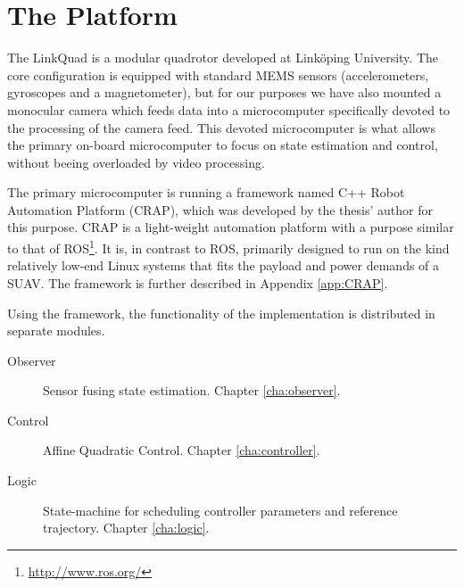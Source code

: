 \section{The Platform}
    The LinkQuad is a modular quadrotor developed at Linköping University.
    The core configuration is equipped with standard MEMS sensors
    (accelerometers, gyroscopes and a magnetometer),
    but for our purposes we have also mounted a monocular camera which feeds data
    into a microcomputer specifically devoted to the processing of the camera feed.
    This devoted microcomputer is what allows the primary on-board microcomputer
    to focus on state estimation and control, without beeing overloaded by
    video processing.

    The primary microcomputer is running a framework named C++ Robot Automation Platform (CRAP),
    which was developed by the thesis' author for this purpose. CRAP is a light-weight
    automation platform with a purpose similar to that of ROS\footnote{\url{http://www.ros.org/}}.
    It is, in contrast to ROS, primarily designed to run on the kind relatively low-end Linux systems
    that fits the payload and power demands of a SUAV. The framework is further
    described in Appendix \ref{app:CRAP}.

    Using the framework, the functionality of the implementation is
    distributed in separate modules.
    \begin{description}
        \item[Observer] Sensor fusing state estimation. Chapter \ref{cha:observer}.
        \item[Control]  Affine Quadratic Control. Chapter \ref{cha:controller}.
        \item[Logic]    State-machine for scheduling controller parameters and reference trajectory. Chapter \ref{cha:logic}.
    \end{description}
